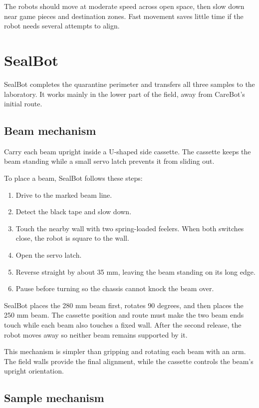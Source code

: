 \documentclass[11pt,a4paper]{article}
\begin{document}
The robots should move at moderate speed across open space, then slow down near game pieces and destination zones. Fast movement saves little time if the robot needs several attempts to align.

\section{SealBot}

SealBot completes the quarantine perimeter and transfers all three samples to the laboratory. It works mainly in the lower part of the field, away from CareBot's initial route.

\subsection{Beam mechanism}

Carry each beam upright inside a U-shaped side cassette. The cassette keeps the beam standing while a small servo latch prevents it from sliding out.

To place a beam, SealBot follows these steps:

\begin{enumerate}
  \item Drive to the marked beam line.
  \item Detect the black tape and slow down.
  \item Touch the nearby wall with two spring-loaded feelers. When both switches close, the robot is square to the wall.
  \item Open the servo latch.
  \item Reverse straight by about 35 mm, leaving the beam standing on its long edge.
  \item Pause before turning so the chassis cannot knock the beam over.
\end{enumerate}

SealBot places the 280 mm beam first, rotates 90 degrees, and then places the 250 mm beam. The cassette position and route must make the two beam ends touch while each beam also touches a fixed wall. After the second release, the robot moves away so neither beam remains supported by it.

This mechanism is simpler than gripping and rotating each beam with an arm. The field walls provide the final alignment, while the cassette controls the beam's upright orientation.

\subsection{Sample mechanism}
\end{document}
